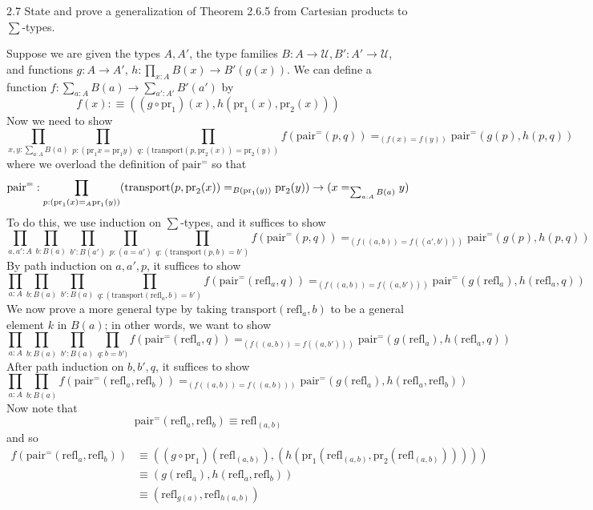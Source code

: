 \documentclass[14pt]{extarticle}
\newcommand{\0}{{\mathbf 0}}
\newcommand{\1}{{\mathbf 1}}
\newcommand{\2}{{\mathbf 2}}
\newcommand{\UU}{{\mathcal U}}
\newcommand{\refl}{\mathrm{refl}}
\newcommand{\pr}{\mathrm{pr}}
\newcommand{\tr}{\mathrm{transport}}
\newcommand{\pair}{\mathrm{pair}}
\begin{document}
\begin{prob}{2.7}{}
State and prove a generalization of Theorem 2.6.5 from Cartesian products to $\sum$-types.
\end{prob}
Suppose we are given the types $A,A'$, the type families $B : A \to \UU, B' : A' \to \UU$, and functions $g : A \to A'$, $h : \prod_{x : A}B(x) \to B'(g(x))$. We can define a function $f : \sum_{a:A}B(a) \to \sum_{a':A'}B'(a')$ by
\[f(x) :\equiv ((g \circ \pr_1)(x),h(\pr_1(x),\pr_2(x)))\]
Now we need to show
\[\prod_{x,y : \sum_{a:A}B(a)}\prod_{p : (\pr_1x = \pr_1y)}\prod_{q : (\tr(p,\pr_2(x)) = \pr_2(y))} f(\pair^=(p,q)) =_{(f(x) = f(y))} \pair^=(g(p),h(p,q))\]
where we overload the definition of $\pair^=$ so that
\[
\pair^= : \prod_{p:(\pr_1(x) =_A \pr_1(y))} (\tr(p,\pr_2(x)) =_{B(\pr_1(y))} \pr_2(y))\\
\to (x=_{\sum_{a:A}B(a)}y)\]
To do this, we use induction on $\sum$-types, and it suffices to show
\[\prod_{a,a' :A} \prod_{b : B(a)}\prod_{b' : B(a')}\prod_{p : (a = a')}\prod_{q : (\tr(p,b) = b')} f(\pair^=(p,q)) =_{(f((a,b)) = f((a',b')))} \pair^=(g(p),h(p,q))\]
By path induction on $a,a',p$, it suffices to show
\[\prod_{a:A} \prod_{b : B(a)}\prod_{b' : B(a)}\prod_{q : (\tr(\refl_a,b) = b')} f(\pair^=(\refl_a,q)) =_{(f((a,b)) = f((a,b')))} \pair^=(g(\refl_a),h(\refl_a,q))\]
We now prove a more general type by taking $\tr(\refl_a,b)$ to be a general element $k$ in $B(a)$; in other words, we want to show
\[\prod_{a:A} \prod_{b : B(a)}\prod_{b' : B(a)}\prod_{q : b = b')} f(\pair^=(\refl_a,q)) =_{(f((a,b)) = f((a,b')))} \pair^=(g(\refl_a),h(\refl_a,q))\]
After path induction on $b,b',q$, it suffices to show
\[\prod_{a:A} \prod_{b : B(a)} f(\pair^=(\refl_a,\refl_b)) =_{(f((a,b)) = f((a,b)))} \pair^=(g(\refl_a),h(\refl_a,\refl_b))\] Now note that \[\pair^=(\refl_a,\refl_b) \equiv \refl_{(a,b)}\] and so 
\begin{align*}
f(\pair^=(\refl_a,\refl_b)) &\equiv ((g \circ \pr_1)(\refl_{(a,b)}),(h(\pr_1(\refl_{(a,b)},\pr_2(\refl_{(a,b)})))))\\
&\equiv (g(\refl_{a}),h(\refl_{a},\refl_{b}))\\
&\equiv (\refl_{g(a)},\refl_{h(a,b)})\\
\end{align*}
\end{document}

